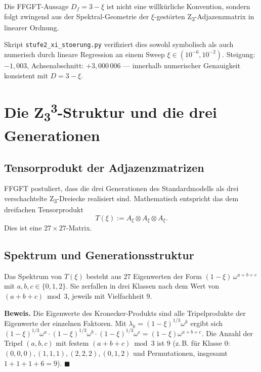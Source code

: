 \begin{keyresult}
Die FFGFT-Aussage \(D_f = 3 - \xi\) ist nicht eine willkürliche Konvention, sondern folgt zwingend aus der Spektral-Geometrie der \(\xi\)-gestörten Z\textsubscript{3}-Adjazenzmatrix in linearer Ordnung.
\end{keyresult}

Skript \texttt{stufe2\_xi\_stoerung.py} verifiziert dies sowohl symbolisch als auch numerisch durch lineare Regression an einem Sweep \(\xi \in (10^{-6}, 10^{-2})\). Steigung: \(-1{,}003\), Achsenabschnitt: \(+3{,}000\,006\) — innerhalb numerischer Genauigkeit konsistent mit \(D = 3 - \xi\).

\section{Die Z\textsubscript{3}\textsuperscript{3}-Struktur und die drei Generationen}
\label{sec:kern3}

\subsection{Tensorprodukt der Adjazenzmatrizen}

FFGFT postuliert, dass die drei Generationen des Standardmodells als drei verschachtelte Z\textsubscript{3}-Dreiecke realisiert sind. Mathematisch entspricht das dem dreifachen Tensorprodukt
\begin{equation}
T(\xi) := A_\xi \otimes A_\xi \otimes A_\xi.
\label{eq:T}
\end{equation}
Dies ist eine \(27 \times 27\)-Matrix.

\subsection{Spektrum und Generationsstruktur}

\begin{foundation}[Grundlage: 27 = 3\textsuperscript{3} Eigenwerte]
Das Spektrum von \(T(\xi)\) besteht aus \(27\) Eigenwerten der Form \((1-\xi)\,\omega^{a+b+c}\) mit \(a, b, c \in \{0, 1, 2\}\). Sie zerfallen in drei Klassen nach dem Wert von \((a+b+c) \bmod 3\), jeweils mit Vielfachheit \(9\).
\end{foundation}

\noindent\textbf{Beweis.} Die Eigenwerte des Kronecker-Produkts sind alle Tripelprodukte der Eigenwerte der einzelnen Faktoren. Mit \(\lambda_k = (1-\xi)^{1/3} \omega^k\) ergibt sich \((1-\xi)^{1/3} \omega^a \cdot (1-\xi)^{1/3} \omega^b \cdot (1-\xi)^{1/3} \omega^c = (1-\xi) \omega^{a+b+c}\). Die Anzahl der Tripel \((a,b,c)\) mit festem \((a+b+c) \bmod 3\) ist \(9\) (z.\,B. für Klasse 0: \((0,0,0), (1,1,1), (2,2,2), (0,1,2)\) und Permutationen, insgesamt \(1 + 1 + 1 + 6 = 9\)). \(\blacksquare\)

